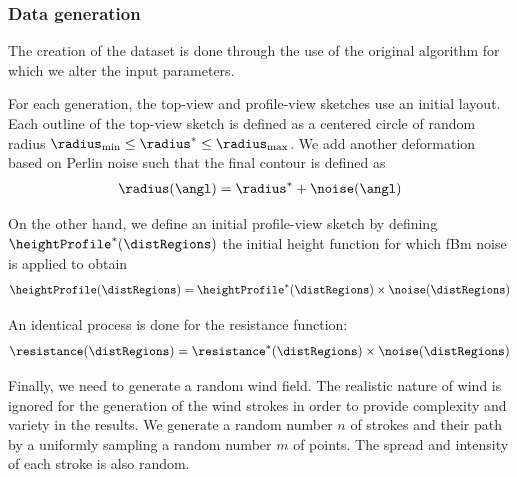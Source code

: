 

\subsubsection{Data generation}

The creation of the dataset is done through the use of the original algorithm for which we alter the input parameters. 

For each generation, the top-view and profile-view sketches use an initial layout. Each outline of the top-view sketch is defined as a centered circle of random radius $\radius_\text{min} \leq \radius^* \leq \radius_\text{max}$. We add another deformation based on Perlin noise such that the final contour is defined as 
\begin{align}
    \radius(\angl) = \radius^* + \noise(\angl)
\end{align}

On the other hand, we define an initial profile-view sketch by defining $\heightProfile^*(\distRegions)$ the initial height function for which fBm noise is applied to obtain 
\begin{align}
    \heightProfile(\distRegions) = \heightProfile^*(\distRegions) \times \noise(\distRegions)
\end{align}

An identical process is done for the resistance function:
\begin{align}
    \resistance(\distRegions) = \resistance^*(\distRegions) \times \noise(\distRegions)
\end{align}

Finally, we need to generate a random wind field. The realistic nature of wind is ignored for the generation of the wind strokes in order to provide complexity and variety in the results. 
We generate a random number $n$ of strokes and their path by a uniformly sampling a random number $m$ of points. The spread and intensity of each stroke is also random.

